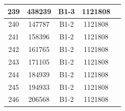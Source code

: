 \documentclass[UTF8,10pt,a4paper,fontset=fandol]{ctexart}
\newcommand{\fieldvalue}[1]{#1}
\begin{document}
\begin{center}
\begin{tabular}{|c|c|c|c|c|}
239 &
\fieldvalue{438239} &
\fieldvalue{B1-3} &
\fieldvalue{1121808} & \\ \hline
240 &
\fieldvalue{147787} &
\fieldvalue{B1-2} &
\fieldvalue{1121808} & \\ \hline
241 &
\fieldvalue{158396} &
\fieldvalue{B1-2} &
\fieldvalue{1121808} & \\ \hline
242 &
\fieldvalue{161765} &
\fieldvalue{B1-2} &
\fieldvalue{1121808} & \\ \hline
243 &
\fieldvalue{171105} &
\fieldvalue{B1-2} &
\fieldvalue{1121808} & \\ \hline
244 &
\fieldvalue{184939} &
\fieldvalue{B1-2} &
\fieldvalue{1121808} & \\ \hline
245 &
\fieldvalue{194933} &
\fieldvalue{B1-2} &
\fieldvalue{1121808} & \\ \hline
246 &
\fieldvalue{206568} &
\fieldvalue{B1-2} &
\fieldvalue{1121808} & \\ \hline

\end{tabular}
\end{center}
\end{document}
